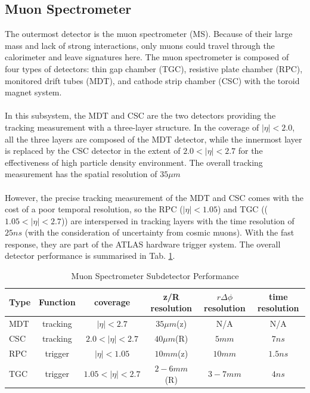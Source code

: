 \subsection{Muon Spectrometer}
The outermost detector is the muon spectrometer (MS). Because of their large mass and lack of strong interactions, only muons could travel through the calorimeter and leave signatures here. The muon spectrometer is composed of four types of detectors: thin gap chamber (TGC), resistive plate chamber (RPC), monitored drift tubes (MDT), and cathode strip chamber (CSC) with the toroid magnet system.  
\\
\\In this subsystem, the MDT and CSC are the two detectors providing the tracking measurement with a three-layer structure. In the coverage of $|\eta|<2.0$, all the three layers are composed of the MDT detector, while the innermost layer is replaced by the CSC detector in the extent of $2.0<|\eta|<2.7$ for the effectiveness of high particle density environment. The overall tracking measurement has the spatial resolution of $35 \mu m$
\\
\\However, the precise tracking measurement of the MDT and CSC comes with the cost of a poor temporal resolution, so the RPC ($|\eta|<1.05$) and TGC (($1.05<|\eta|<2.7$)) are interspersed in tracking layers with the time resolution of $25ns$ (with the consideration of uncertainty from cosmic muons). With the fast response, they are part of the ATLAS hardware trigger system. The overall detector performance is summarised in Tab. \ref{Tab:ms}.

\begin{table}[h]
	\caption{Muon Spectrometer Subdetector Performance}
	\renewcommand{\arraystretch}{1.3}
	\centering
	\begin{tabular}{l | c | c | c | c | c }
		\hline
		\hline
		{\bf Type}     &{\bf Function} &{\bf coverage}    &{\bf z/R resolution}  &{\bf $r \Delta \phi$ resolution}&{\bf time resolution}\\
		\hline
		MDT            &tracking       &$|\eta|<2.7$      &$35\mu m$(z)          &N/A                             &N/A            \\
		\hline
		CSC            &tracking       &$2.0<|\eta|<2.7$  &$40\mu m$(R)          &$5mm$                           &$7ns$          \\
		\hline
		RPC            &trigger        &$|\eta|<1.05$     &$10mm$(z)             &$10mm$                          &$1.5ns$         \\
		\hline
		TGC            &trigger        &$1.05<|\eta|<2.7$ &$2-6mm$(R)            &$3-7mm$                         &$4ns$           \\
		\hline
	\end{tabular}
	\label{Tab:ms}
\end{table}


